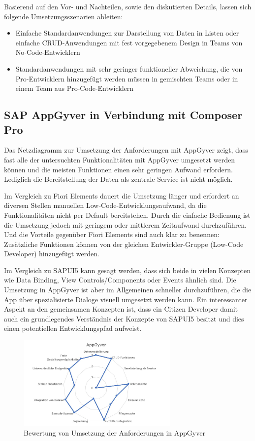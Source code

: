 Basierend auf den Vor- und Nachteilen, sowie den diskutierten Details, lassen sich folgende Umsetzungsszenarien ableiten:
\begin{itemize} 
  \item Einfache Standardanwendungen zur Darstellung von Daten in Listen oder einfache CRUD-Anwendungen mit fest vorgegebenem Design in Teams von No-Code-Entwicklern
  \item Standardanwendungen mit sehr geringer funktioneller Abweichung, die von Pro-Entwicklern hinzugefügt werden müssen in gemischten Teams oder in einem Team aus Pro-Code-Entwicklern
\end{itemize}

\subsection{SAP AppGyver in Verbindung mit Composer Pro}
Das Netzdiagramm zur Umsetzung der Anforderungen mit AppGyver zeigt, dass fast alle der untersuchten Funktionalitäten mit AppGyver umgesetzt werden können und die meisten Funktionen einen sehr geringen Aufwand erfordern. Lediglich die Bereitstellung der Daten als zentrale Service ist nicht möglich. 

Im Vergleich zu Fiori Elements dauert die Umsetzung länger und erfordert an diversen Stellen manuellen Low-Code-Entwicklungsaufwand, da die Funktionalitäten nicht per Default bereitstehen. Durch die einfache Bedienung ist die Umsetzung jedoch mit geringem oder mittlerem Zeitaufwand durchzuführen. Und die Vorteile gegenüber Fiori Elements sind auch klar zu benennen: Zusätzliche Funktionen können von der gleichen Entwickler-Gruppe (Low-Code Developer) hinzugefügt werden.

Im Vergleich zu SAPUI5 kann gesagt werden, dass sich beide in vielen Konzepten wie Data Binding, View Controls/Components oder Events ähnlich sind. Die Umsetzung in AppGyver ist aber im Allgemeinen schneller durchzuführen, die die App über spezialisierte Dialoge visuell umgesetzt werden kann. Ein interessanter Aspekt an den gemeinsamen Konzepten ist, dass ein Citizen Developer damit auch ein grundlegendes Verständnis der Konzepte von SAPUI5 besitzt und dies einen potentiellen Entwicklungspfad aufweist.

\begin{figure}[!htbp]
 \centering
 \includegraphics[width=0.7\textwidth]{Bilder/bewertung/ND_AppGyver.jpg}
 \caption{Bewertung von Umsetzung der Anforderungen in AppGyver}
\end{figure}

